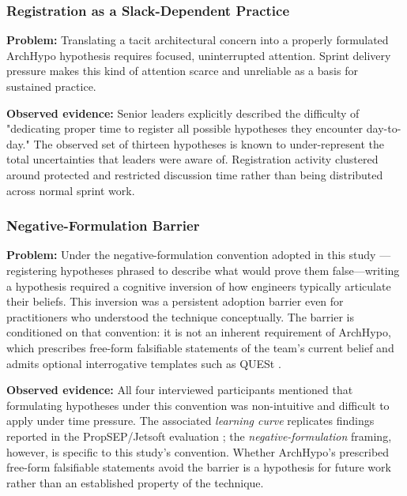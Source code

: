 \subsubsection{Registration as a Slack-Dependent Practice}
\label{subsubsec:pattern-a3}

\textbf{Problem:} Translating a tacit architectural concern into a properly
formulated ArchHypo hypothesis requires focused, uninterrupted attention.
Sprint delivery pressure makes this kind of attention scarce and unreliable as
a basis for sustained practice.

\textbf{Observed evidence:} Senior leaders explicitly described the difficulty
of "dedicating proper time to register all possible hypotheses they encounter
day-to-day." The observed set of thirteen hypotheses is known to
under-represent the total uncertainties that leaders were aware of. Registration
activity clustered around protected and restricted discussion time rather than being distributed
across normal sprint work.

\subsubsection{Negative-Formulation Barrier}
\label{subsubsec:pattern-a4}
\textbf{Problem:} Under the negative-formulation convention adopted in this study
---registering hypotheses phrased to describe what would prove them false---writing
a hypothesis required a cognitive inversion of how engineers typically articulate
their beliefs. This inversion was a persistent adoption barrier even for
practitioners who understood the technique conceptually. The barrier is conditioned
on that convention: it is not an inherent requirement of ArchHypo, which prescribes
free-form falsifiable statements of the team's current belief \citep{silva2024tse}
and admits optional interrogative templates such as QUESt \citep{melegati2019quest}.

\textbf{Observed evidence:} All four interviewed participants mentioned that
formulating hypotheses under this convention was non-intuitive and difficult to
apply under time pressure. The associated \emph{learning curve} replicates findings
reported in the PropSEP/Jetsoft evaluation \citep{silva2025archhypo}; the
\emph{negative-formulation} framing, however, is specific to this study's convention.
Whether ArchHypo's prescribed free-form falsifiable statements avoid the barrier is
a hypothesis for future work rather than an established property of the technique.

